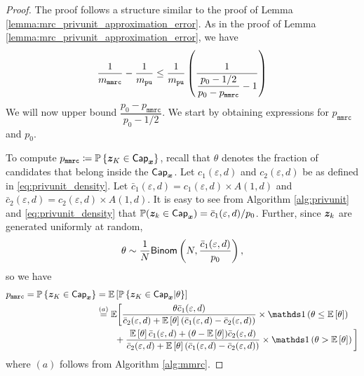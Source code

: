 \begin{proof}
The proof follows a structure similar to the proof of Lemma \ref{lemma:mrc_privunit_approximation_error}. As in the proof of Lemma \ref{lemma:mrc_privunit_approximation_error}, we have
\begin{align}
    \frac{1}{m_\texttt{mmrc}} - \frac{1}{m_{\texttt{pu}}} \leq \frac{1}{m_{\texttt{pu}}}\left(\frac{ 1 }{ \dfrac{p_0 -1/2}{p_0 - p_\texttt{mmrc}}-1}\right)
    \label{eq:mmrc_privunit_approximation_error_1}
\end{align}
We will now upper bound $\dfrac{p_0 - p_\texttt{mmrc}}{p_0 -1/2}$. We start by obtaining expressions for $p_\texttt{mmrc}$ and $p_0$.

To compute $p_\texttt{mmrc} \coloneqq \mathbb{P}\left\{ {\boldsymbol{z}}_K \in \mathsf{Cap}_{{\boldsymbol{x}}} \right\}$, recall that $\theta$ denotes the fraction of candidates that belong inside the $\mathsf{Cap}_{{\boldsymbol{x}}}$. Let $c_1(\varepsilon, d)$ and $c_2(\varepsilon, d)$ be as defined in \eqref{eq:privunit_density}. Let $\bar{c}_1(\varepsilon, d) = c_1(\varepsilon, d) \times A(1,d)$ and $\bar{c}_2(\varepsilon, d) = c_2(\varepsilon, d) \times A(1,d)$. It is easy to see from Algorithm \ref{alg:privunit} and \eqref{eq:privunit_density} that $\mathbb{P}({\boldsymbol{z}}_k \in \mathsf{Cap}_{{\boldsymbol{x}}}) =  \bar{c}_1(\varepsilon, d) / p_0$. 
Further, since ${\boldsymbol{z}}_k$ are generated uniformly at random,
$$ \theta \sim \frac{1}{N} \mathsf{Binom}\left( N, \frac{ \bar{c}_1(\varepsilon, d)}{p_0}\right),$$ so we have
\begin{align}
    p_\texttt{mmrc} = \Pr\lbp \svbz_K \in \msf{Cap}_{\svbx} \rbp  & = \E\lb \Pr\lbp \svbz_K \in \msf{Cap}_{\svbx}| \theta \rbp \rb  \\
    & \stackrel{(a)}{=} \E\bigg[ \frac{\theta  \bar{c}_1(\varepsilon,d) }{ \bar{c}_2(\varepsilon,d) + \E\lb \theta \rb \lp  \bar{c}_1(\varepsilon,d) -  \bar{c}_2(\varepsilon,d) \rp} \times \Indicator \lp \theta \leq \E\lb \theta \rb \rp  \\
    & \qquad + \frac{\E \lb \theta \rb   \bar{c}_1(\varepsilon,d) + (\theta - \E \lb \theta \rb)  \bar{c}_2(\varepsilon,d)}{ \bar{c}_2(\varepsilon,d) + \E\lb \theta \rb \lp  \bar{c}_1(\varepsilon,d) -  \bar{c}_2(\varepsilon,d) \rp}  \times \Indicator \lp \theta > \E\lb \theta \rb \rp \bigg]
    \label{eq:mmrc_privunit_approximation_error_2}
\end{align}
where $(a)$ follows from Algorithm \ref{alg:mmrc}.


\end{proof}
